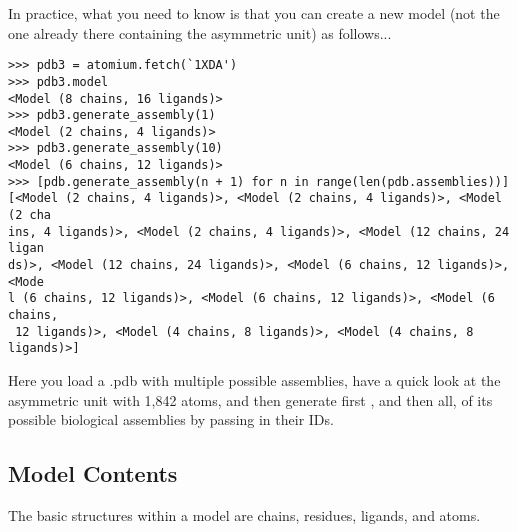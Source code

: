 In practice, what you need to know is that you can create a new model (not the
one already there containing the asymmetric unit) as follows...

\begin{verbatim}
>>> pdb3 = atomium.fetch(`1XDA')
>>> pdb3.model
<Model (8 chains, 16 ligands)>
>>> pdb3.generate_assembly(1)
<Model (2 chains, 4 ligands)>
>>> pdb3.generate_assembly(10)
<Model (6 chains, 12 ligands)>
>>> [pdb.generate_assembly(n + 1) for n in range(len(pdb.assemblies))]
[<Model (2 chains, 4 ligands)>, <Model (2 chains, 4 ligands)>, <Model (2 cha
ins, 4 ligands)>, <Model (2 chains, 4 ligands)>, <Model (12 chains, 24 ligan
ds)>, <Model (12 chains, 24 ligands)>, <Model (6 chains, 12 ligands)>, <Mode
l (6 chains, 12 ligands)>, <Model (6 chains, 12 ligands)>, <Model (6 chains,
 12 ligands)>, <Model (4 chains, 8 ligands)>, <Model (4 chains, 8 ligands)>]
\end{verbatim}

Here you load a .pdb with multiple possible assemblies, have a quick look at
the asymmetric unit with 1,842 atoms, and then generate first , and then all,
of its possible biological assemblies by passing in their IDs.

\subsection{Model Contents}

The basic structures within a model are chains, residues, ligands, and atoms.

